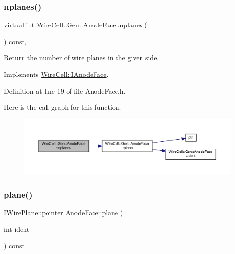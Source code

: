 \subsubsection{\texorpdfstring{nplanes()}{nplanes()}}
{\footnotesize\ttfamily virtual int Wire\+Cell\+::\+Gen\+::\+Anode\+Face\+::nplanes (\begin{DoxyParamCaption}{ }\end{DoxyParamCaption}) const\hspace{0.3cm}{\ttfamily [inline]}, {\ttfamily [virtual]}}



Return the number of wire planes in the given side. 



Implements \hyperlink{class_wire_cell_1_1_i_anode_face_a5423e72fe99935c08c3076bda3a7354f}{Wire\+Cell\+::\+I\+Anode\+Face}.



Definition at line 19 of file Anode\+Face.\+h.

Here is the call graph for this function\+:
\nopagebreak
\begin{figure}[H]
\begin{center}
\leavevmode
\includegraphics[width=350pt]{class_wire_cell_1_1_gen_1_1_anode_face_aa4becde47c5ca6e98a08674a61b33b72_cgraph}
\end{center}
\end{figure}
\mbox{\label{class_wire_cell_1_1_gen_1_1_anode_face_a6ed6d7c6614695d5ace93aa10b0d2478}} 
\subsubsection{\texorpdfstring{plane()}{plane()}}
{\footnotesize\ttfamily \hyperlink{class_wire_cell_1_1_interface_a09c548fb8266cfa39afb2e74a4615c37}{I\+Wire\+Plane\+::pointer} Anode\+Face\+::plane (\begin{DoxyParamCaption}\item[{int}]{ident }\end{DoxyParamCaption}) const\hspace{0.3cm}{\ttfamily [virtual]}}



